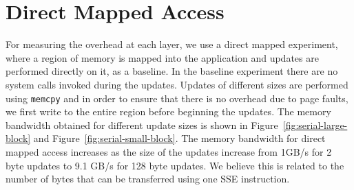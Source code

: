 \section{Direct Mapped Access}
For measuring the overhead at each layer, we use a direct mapped
experiment, where a region of memory is mapped into the application
and updates are performed directly on it, as a baseline. In the
baseline experiment there are no system calls invoked during the
updates. Updates of different sizes are performed using
\texttt{memcpy} and in order to ensure that there is no overhead due
to page faults, we first write to the entire region before beginning
the updates. The memory bandwidth obtained for different update sizes
is shown in Figure~\ref{fig:serial-large-block} and
Figure~\ref{fig:serial-small-block}. The memory bandwidth for direct
mapped access increases as the size of the updates increase from 1GB/s
for 2 byte updates to 9.1 GB/s for 128 byte updates. We believe this
is related to the number of bytes that can be transferred using one
SSE instruction.


